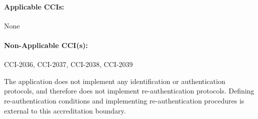 \documentclass[letterpaper, 10pt, twoside]{article}
\begin{document}
\paragraph{Applicable CCIs:} None

\paragraph{Non-Applicable CCI(s):} CCI-2036, CCI-2037, CCI-2038, CCI-2039

The application does not implement any identification or authentication protocols, and therefore does not implement re-authentication protocols. Defining re-authentication conditions and implementing re-authentication procedures is external to this accreditation boundary.

\clearpage
\printbibliography
\end{document}
